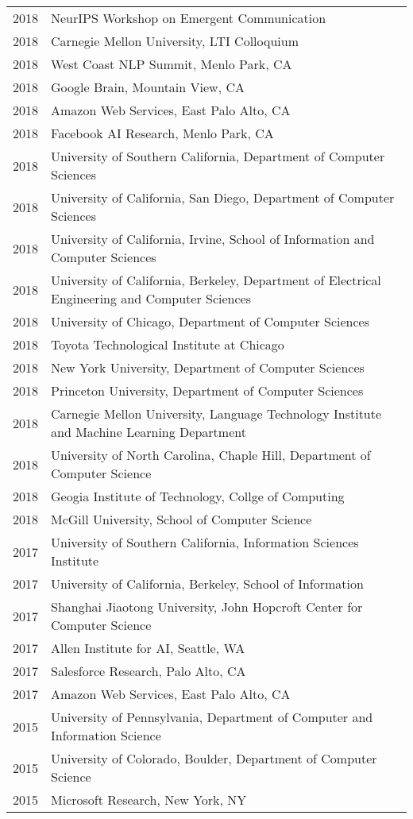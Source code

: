 \documentclass[a4paper,11pt]{article}
\begin{document}
\begin{longtable}{rl}
    2018 & NeurIPS Workshop on Emergent Communication \\
    2018 & Carnegie Mellon University, LTI Colloquium \\
    2018 & West Coast NLP Summit, Menlo Park, CA \\
    2018 & Google Brain, Mountain View, CA \\
    2018 & Amazon Web Services, East Palo Alto, CA \\
    2018 & Facebook AI Research, Menlo Park, CA \\
    2018 & University of Southern California, Department of Computer Sciences \\
    2018 & University of California, San Diego, Department of Computer Sciences \\
    2018 & University of California, Irvine, School of Information and Computer Sciences \\
    2018 & University of California, Berkeley, Department of Electrical Engineering and Computer Sciences \\
    2018 & University of Chicago, Department of Computer Sciences \\
    2018 & Toyota Technological Institute at Chicago \\
    2018 & New York University, Department of Computer Sciences \\
    2018 & Princeton University, Department of Computer Sciences \\
    2018 & Carnegie Mellon University, Language Technology Institute and Machine Learning Department \\
    2018 & University of North Carolina, Chaple Hill, Department of Computer Science \\
    2018 & Geogia Institute of Technology, Collge of Computing \\
    2018 & McGill University, School of Computer Science \\
    2017 & University of Southern California, Information Sciences Institute \\
    2017 & University of California, Berkeley, School of Information \\
    2017 & Shanghai Jiaotong University, John Hopcroft Center for Computer Science \\
    2017 & Allen Institute for AI, Seattle, WA \\
    2017 & Salesforce Research, Palo Alto, CA \\
    2017 & Amazon Web Services, East Palo Alto, CA \\
    2015 & University of Pennsylvania, Department of Computer and Information Science \\
    2015 & University of Colorado, Boulder, Department of Computer Science \\
    2015 & Microsoft Research, New York, NY \\
\end{longtable}
\end{document}
